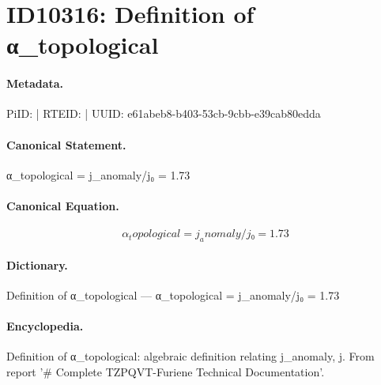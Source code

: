 \section*{ID10316: Definition of α\_topological}
\paragraph{Metadata.}
PiID:  | RTEID:  | UUID: e61abeb8-b403-53cb-9cbb-e39cab80edda

\paragraph{Canonical Statement.}
α\_topological = j\_anomaly/j₀ = 1.73

\paragraph{Canonical Equation.}
\[
α_topological = j_anomaly/j₀ = 1.73
\]

\paragraph{Dictionary.}
Definition of α\_topological — α\_topological = j\_anomaly/j₀ = 1.73

\paragraph{Encyclopedia.}
Definition of α\_topological: algebraic definition relating j\_anomaly, j. From report '\# Complete TZPQVT-Furiene Technical Documentation'.
